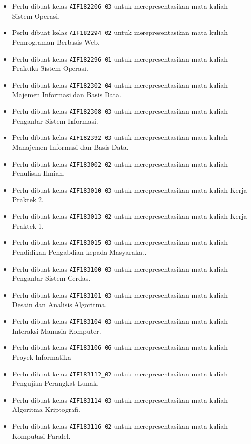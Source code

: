 \documentclass[a4paper,twoside]{article}
\begin{document}
\begin{enumerate}
\begin{enumerate}
\begin{enumerate}
\begin{itemize}
					\item Perlu dibuat kelas \texttt{AIF182206\_03} untuk merepresentasikan mata kuliah Sistem Operasi.
					\item Perlu dibuat kelas \texttt{AIF182294\_02} untuk merepresentasikan mata kuliah Pemrograman Berbasis Web.
					\item Perlu dibuat kelas \texttt{AIF182296\_01} untuk merepresentasikan mata kuliah Praktika Sistem Operasi.
					\item Perlu dibuat kelas \texttt{AIF182302\_04} untuk merepresentasikan mata kuliah Majemen Informasi dan Basis Data.
					\item Perlu dibuat kelas \texttt{AIF182308\_03} untuk merepresentasikan mata kuliah Pengantar Sistem Informasi.
					\item Perlu dibuat kelas \texttt{AIF182392\_03} untuk merepresentasikan mata kuliah Manajemen Informasi dan Basis Data.
					\item Perlu dibuat kelas \texttt{AIF183002\_02} untuk merepresentasikan mata kuliah Penulisan Ilmiah.
					\item Perlu dibuat kelas \texttt{AIF183010\_03} untuk merepresentasikan mata kuliah Kerja Praktek 2.
					\item Perlu dibuat kelas \texttt{AIF183013\_02} untuk merepresentasikan mata kuliah Kerja Praktek 1.
					\item Perlu dibuat kelas \texttt{AIF183015\_03} untuk merepresentasikan mata kuliah Pendidikan Pengabdian kepada Masyarakat.
					\item Perlu dibuat kelas \texttt{AIF183100\_03} untuk merepresentasikan mata kuliah Pengantar Sistem Cerdas.
					\item Perlu dibuat kelas \texttt{AIF183101\_03} untuk merepresentasikan mata kuliah Desain dan Analisis Algoritma.
					\item Perlu dibuat kelas \texttt{AIF183104\_03} untuk merepresentasikan mata kuliah Interaksi Manusia Komputer.
					\item Perlu dibuat kelas \texttt{AIF183106\_06} untuk merepresentasikan mata kuliah Proyek Informatika.
					\item Perlu dibuat kelas \texttt{AIF183112\_02} untuk merepresentasikan mata kuliah Pengujian Perangkat Lunak.
					\item Perlu dibuat kelas \texttt{AIF183114\_03} untuk merepresentasikan mata kuliah Algoritma Kriptografi.
					\item Perlu dibuat kelas \texttt{AIF183116\_02} untuk merepresentasikan mata kuliah Komputasi Paralel.

\end{itemize}
\end{enumerate}
\end{enumerate}
\end{enumerate}
\end{document}
